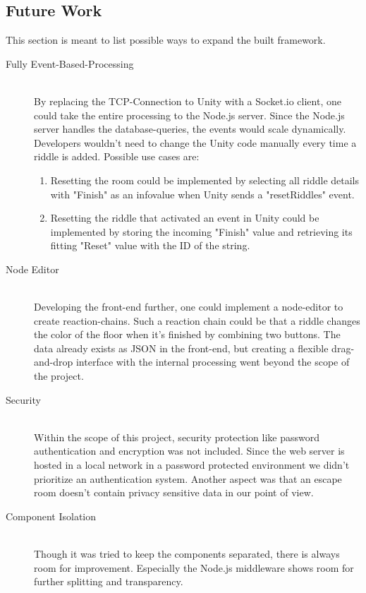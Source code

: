 \subsection{Future Work}
This section is meant to list possible ways to expand the built framework.
\begin{description}
    \item [Fully Event-Based-Processing]\hfill \\ 
    By replacing the TCP-Connection to Unity with a Socket.io client, 
    one could take the entire processing to the Node.js server. 
    Since the Node.js server handles the database-queries,
    the events would scale dynamically. 
    Developers wouldn't need to change the Unity code manually every time a riddle is added. 
    Possible use cases are:
    \begin{enumerate}
        \item Resetting the room could be implemented by selecting all riddle details with "Finish" as an infovalue when Unity sends a "resetRiddles" event.
        \item 
        Resetting the riddle that activated an event in Unity could be implemented by storing the incoming "Finish" 
        value and retrieving its fitting "Reset" value with the ID of the string.
    \end{enumerate}
    \item [Node Editor]\hfill \\
    Developing the front-end further, one could implement a node-editor to create reaction-chains. 
    Such a reaction chain could be that a riddle changes the color of the floor when it's finished by combining two buttons. 
    The data already exists as JSON in the front-end, but creating a flexible drag-and-drop interface with the internal processing 
    went beyond the scope of the project. 
    \item [Security] \hfill \\
    Within the scope of this project, security protection like password authentication and encryption was not included.
    Since the web server is hosted in a local network in a password protected environment we didn't prioritize an authentication system.
    Another aspect was that an escape room doesn't contain privacy sensitive data in our point of view.
    \item [Component Isolation]\hfill \\
    Though it was tried to keep the components separated, there is always room for improvement. 
    Especially the Node.js middleware shows room for further splitting and transparency.

\end{description}
